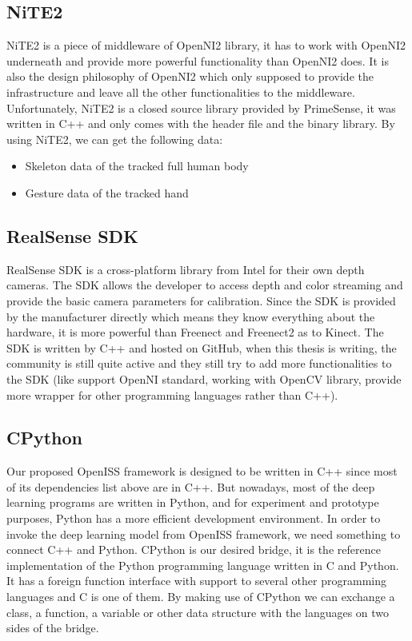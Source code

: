 \subsection{NiTE2}
\label{sec:related_work_openiss_nite2}

NiTE2 is a piece of middleware of OpenNI2 library, it has to work with OpenNI2
underneath and provide more powerful functionality than OpenNI2 does. It is
also the design philosophy of OpenNI2 which only supposed to provide the
infrastructure and leave all the other functionalities to the middleware.
Unfortunately, NiTE2 is a closed source library provided by PrimeSense, it was
written in C++ and only comes with the header file and the binary library. By
using NiTE2, we can get the following data:

\begin{itemize}
    \item Skeleton data of the tracked full human body
    \item Gesture data of the tracked hand
\end{itemize}

\subsection{RealSense SDK}

RealSense SDK is a cross-platform library from Intel for their own depth
cameras. The SDK allows the developer to access depth and color streaming and
provide the basic camera parameters for calibration. Since the SDK is provided
by the manufacturer directly which means they know everything about the
hardware, it is more powerful than Freenect and Freenect2 as to Kinect. The SDK
is written by C++ and hosted on GitHub, when this thesis is writing, the
community is still quite active and they still try to add more functionalities
to the SDK (like support OpenNI standard, working with OpenCV library, provide
more wrapper for other programming languages rather than C++).

\subsection{CPython}
\label{sec:related_work_cpython}

Our proposed OpenISS framework is designed to be written in C++ since most of
its dependencies list above are in C++. But nowadays, most of the deep learning
programs are written in Python, and for experiment and prototype purposes,
Python has a more efficient development environment. In order to invoke the
deep learning model from OpenISS framework, we need something to connect C++
and Python. CPython is our desired bridge, it is the reference implementation
of the Python programming language written in C and Python. It has a foreign
function interface with support to several other programming languages and C is
one of them. By making use of CPython we can exchange a class, a function, a
variable or other data structure with the languages on two sides of the bridge.

